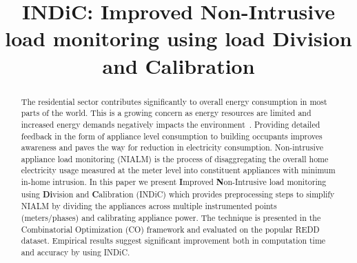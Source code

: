 \documentclass[conference]{IEEEtran}
\newcommand{\indicns}{INDiC}
\begin{document}
%
\title{\indicns: Improved Non-Intrusive load monitoring using load Division and Calibration}


\author{
\and
{}
\and
{}
}
\maketitle


\begin{abstract}
The residential sector contributes significantly to overall energy consumption in most parts of the world. This is a growing concern as energy resources are limited and increased energy demands negatively impacts the environment~\cite{survey2}. Providing detailed feedback in the form of appliance level consumption to building occupants improves awareness and paves the way for reduction in 
electricity consumption. Non-intrusive appliance load monitoring (NIALM) is the process of disaggregating the overall home electricity usage measured at the meter level into constituent appliances with minimum in-home intrusion. In this paper we present \textbf{I}mproved \textbf{N}on-Intrusive load monitoring using \textbf{Di}vision and \textbf{C}alibration (\indicns) which provides preprocessing steps to simplify NIALM by dividing the appliances across multiple instrumented points (meters/phases) and calibrating appliance power. The technique is presented in the Combinatorial Optimization (CO) framework and evaluated on the popular REDD dataset. Empirical results suggest significant improvement both in computation time and accuracy by using \indicns.
\end{abstract}
\IEEEpeerreviewmaketitle
\end{document}
